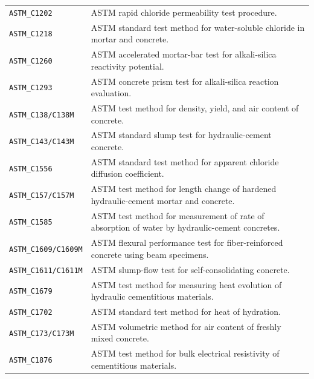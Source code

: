 \documentclass[11pt]{book}
\begin{document}
{\begin{longtable}{p{}p{}}
\texttt{ASTM\_C1202} &
ASTM rapid chloride permeability test procedure. \\

\texttt{ASTM\_C1218} &
ASTM standard test method for water-soluble chloride in mortar and concrete. \\

\texttt{ASTM\_C1260} &
ASTM accelerated mortar-bar test for alkali-silica reactivity potential. \\

\texttt{ASTM\_C1293} &
ASTM concrete prism test for alkali-silica reaction evaluation. \\

\texttt{ASTM\_C138/C138M} &
ASTM test method for density, yield, and air content of concrete. \\

\texttt{ASTM\_C143/C143M} &
ASTM standard slump test for hydraulic-cement concrete. \\

\texttt{ASTM\_C1556} &
ASTM standard test method for apparent chloride diffusion coefficient. \\

\texttt{ASTM\_C157/C157M} &
ASTM test method for length change of hardened hydraulic-cement mortar and concrete. \\

\texttt{ASTM\_C1585} &
ASTM test method for measurement of rate of absorption of water by hydraulic-cement concretes. \\

\texttt{ASTM\_C1609/C1609M} &
ASTM flexural performance test for fiber-reinforced concrete using beam specimens. \\

\texttt{ASTM\_C1611/C1611M} &
ASTM slump-flow test for self-consolidating concrete. \\

\texttt{ASTM\_C1679} &
ASTM test method for measuring heat evolution of hydraulic cementitious materials. \\

\texttt{ASTM\_C1702} &
ASTM standard test method for heat of hydration. \\

\texttt{ASTM\_C173/C173M} &
ASTM volumetric method for air content of freshly mixed concrete. \\

\texttt{ASTM\_C1876} &
ASTM test method for bulk electrical resistivity of cementitious materials. \\


\end{longtable}}
\end{document}
